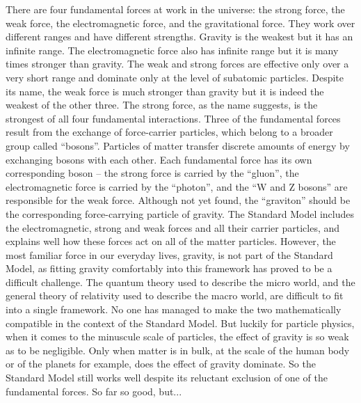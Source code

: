 There are four fundamental forces at work in the universe: the strong force, the weak force, the electromagnetic force, and the gravitational force. They work over different ranges and have different strengths. Gravity is the weakest but it has an infinite range. The electromagnetic force also has infinite range but it is many times stronger than gravity. The weak and strong forces are effective only over a very short range and dominate only at the level of subatomic particles. Despite its name, the weak force is much stronger than gravity but it is indeed the weakest of the other three. The strong force, as the name suggests, is the strongest of all four fundamental interactions.
Three of the fundamental forces result from the exchange of force-carrier particles, which belong to a broader group called “bosons”. Particles of matter transfer discrete amounts of energy by exchanging bosons with each other. Each fundamental force has its own corresponding boson – the strong force is carried by the “gluon”, the electromagnetic force is carried by the “photon”, and the “W and Z bosons” are responsible for the weak force. Although not yet found, the “graviton” should be the corresponding force-carrying particle of gravity. The Standard Model includes the electromagnetic, strong and weak forces and all their carrier particles, and explains well how these forces act on all of the matter particles. However, the most familiar force in our everyday lives, gravity, is not part of the Standard Model, as fitting gravity comfortably into this framework has proved to be a difficult challenge. The quantum theory used to describe the micro world, and the general theory of relativity used to describe the macro world, are difficult to fit into a single framework. No one has managed to make the two mathematically compatible in the context of the Standard Model. But luckily for particle physics, when it comes to the minuscule scale of particles, the effect of gravity is so weak as to be negligible. Only when matter is in bulk, at the scale of the human body or of the planets for example, does the effect of gravity dominate. So the Standard Model still works well despite its reluctant exclusion of one of the fundamental forces.
So far so good, but...

